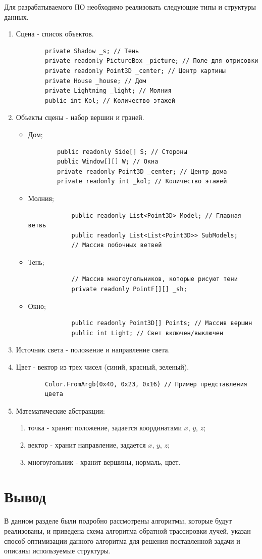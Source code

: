 Для разрабатываемого ПО необходимо реализовать следующие типы и структуры данных.
\begin{enumerate}
	\item Сцена - список объектов.
	
	\begin{verbatim}
		private Shadow _s; // Тень
		private readonly PictureBox _picture; // Поле для отрисовки
		private readonly Point3D _center; // Центр картины
		private House _house; // Дом
		private Lightning _light; // Молния
		public int Kol; // Количество этажей
	\end{verbatim}

	\item Объекты сцены - набор вершин и граней.
	
	\begin{itemize}
		\item Дом;
		\begin{verbatim}
		public readonly Side[] S; // Стороны
		public Window[][] W; // Окна
		private readonly Point3D _center; // Центр дома
		private readonly int _kol; // Количество этажей
		\end{verbatim}
		
		\item Молния;
		
		\begin{verbatim}
			public readonly List<Point3D> Model; // Главная ветвь
			public readonly List<List<Point3D>> SubModels; 
			// Массив побочных ветвей
		\end{verbatim}
	
		\item Тень;
		\begin{verbatim}
			// Массив многоугольников, которые рисуют тени
			private readonly PointF[][] _sh; 
		\end{verbatim}
	
		\item Окно;
		\begin{verbatim}
			public readonly Point3D[] Points; // Массив вершин
			public int Light; // Свет включен/выключен
		\end{verbatim}
	\end{itemize}
	\item Источник света - положение и направление света.
	\item Цвет - вектор из трех чисел (синий, красный, зеленый).
	\begin{verbatim}
		Color.FromArgb(0x40, 0x23, 0x16) // Пример представления 
		цвета
	\end{verbatim}
	\item Математические абстракции:
	\begin{enumerate}
		\item точка - хранит положение, задается координатами $x$, $y$, $z$;
		\item вектор - хранит направление, задается  $x$, $y$, $z$;

		\item многоугольник - хранит вершины, нормаль, цвет.
	\end{enumerate}
\end{enumerate}


\section{Вывод}
В данном разделе были подробно рассмотрены алгоритмы, которые будут реализованы, и приведена схема алгоритма обратной трассировки лучей, указан способ оптимизации данного алгоритма для решения поставленной задачи и описаны используемые структуры.
